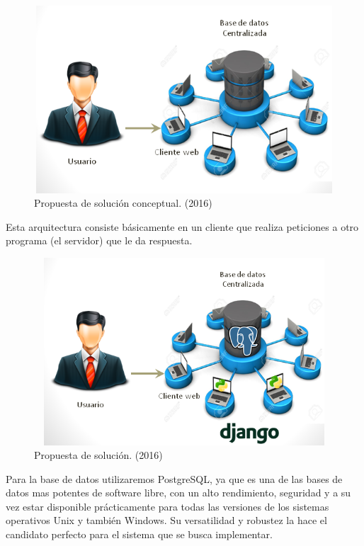 \begin{figure}[H]
\begin{center}
	\includegraphics[width=13cm,height=7cm]{img/sin_tecnologia.png}
\end{center}
\caption{Propuesta de solución conceptual. (2016)}
\label{fig:Sin_Tec}
\end{figure}

Esta arquitectura consiste básicamente en un cliente que realiza peticiones a otro programa (el servidor) que le da respuesta.

\begin{figure}[H]
\begin{center}
	\includegraphics[width=13cm,height=7cm]{img/con_tecnologia.png}
\end{center}
\caption{Propuesta de solución. (2016)}
\label{fig:Con_Tec}
\end{figure}

Para la base de datos utilizaremos PostgreSQL, ya que es una de las bases de datos mas potentes de software libre, con un alto rendimiento, seguridad y a su vez estar disponible prácticamente para todas las versiones de los sistemas operativos Unix y también Windows. Su versatilidad y robustez la hace el candidato perfecto para el sistema que se busca implementar.


